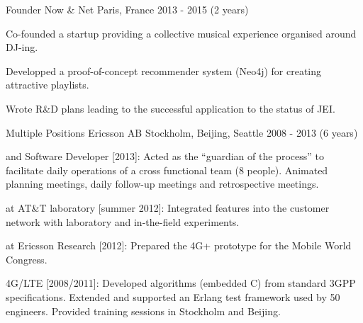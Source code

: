 

\begin{cventries}

  \cventry
    {Founder} %
    {Now \& Net} %
    {Paris, France} %
    {2013 - 2015 (2 years)} %
    {
      \begin{cvitems} %
        \item {Co-founded a startup providing a collective musical experience organised around DJ-ing.}
        \item {Developped a proof-of-concept recommender system (Neo4j) for creating attractive playlists.}
        \item {Wrote R\&D plans leading to the successful application to the status of JEI.}
      \end{cvitems}
    }

  \cventry
    {Multiple Positions} %
    {Ericsson AB} %
    {Stockholm, Beijing, Seattle} %
    {2008 - 2013 (6 years)} %
    {
      \begin{cvitems} %
        \item { and Software Developer [2013]: Acted as the ``guardian of the process'' to facilitate daily operations of a cross functional team (8 people). Animated planning meetings, daily follow-up meetings and retrospective meetings.}
        \item { at AT\&T laboratory [summer 2012]: Integrated features into the customer network with laboratory and in-the-field experiments.}
        \item { at Ericsson Research [2012]: Prepared the 4G+ prototype for the Mobile World Congress.}
        \item { 4G/LTE [2008/2011]: Developed algorithms (embedded C) from standard 3GPP specifications. Extended and supported an Erlang test framework used by 50 engineers. Provided training sessions in Stockholm and Beijing.}
      \end{cvitems}
    }

\end{cventries}
